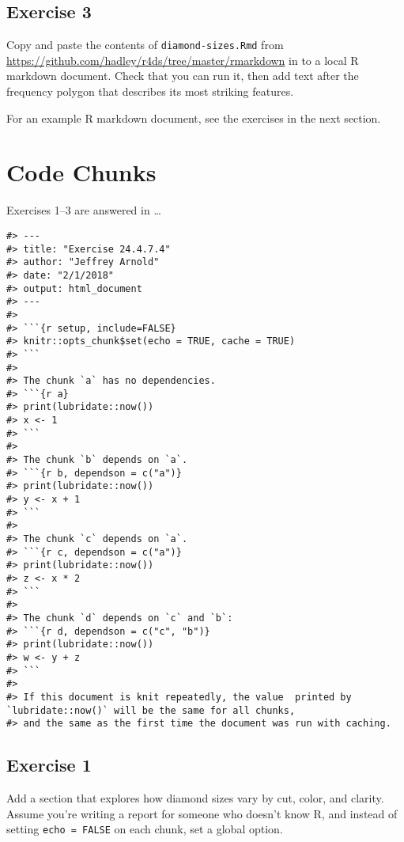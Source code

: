 \documentclass[]{book}
\theoremstyle{definition}
\theoremstyle{definition}
\theoremstyle{definition}
\theoremstyle{remark}
\begin{document}
\hypertarget{exercise-3-49}{%
\subsection{Exercise 3}\label{exercise-3-49}}

Copy and paste the contents of \texttt{diamond-sizes.Rmd} from
\url{https://github.com/hadley/r4ds/tree/master/rmarkdown} in to a local
R markdown document. Check that you can run it, then add text after the
frequency polygon that describes its most striking features.

For an example R markdown document, see the exercises in the next
section.

\hypertarget{code-chunks}{%
\section{Code Chunks}\label{code-chunks}}

Exercises 1--3 are answered in \ldots{}

\begin{verbatim}
#> ---
#> title: "Exercise 24.4.7.4"
#> author: "Jeffrey Arnold"
#> date: "2/1/2018"
#> output: html_document
#> ---
#> 
#> ```{r setup, include=FALSE}
#> knitr::opts_chunk$set(echo = TRUE, cache = TRUE)
#> ```
#> 
#> The chunk `a` has no dependencies.
#> ```{r a}
#> print(lubridate::now())
#> x <- 1
#> ```
#> 
#> The chunk `b` depends on `a`.
#> ```{r b, dependson = c("a")}
#> print(lubridate::now())
#> y <- x + 1
#> ```
#> 
#> The chunk `c` depends on `a`.
#> ```{r c, dependson = c("a")}
#> print(lubridate::now())
#> z <- x * 2
#> ```
#> 
#> The chunk `d` depends on `c` and `b`:
#> ```{r d, dependson = c("c", "b")}
#> print(lubridate::now())
#> w <- y + z
#> ```
#> 
#> If this document is knit repeatedly, the value  printed by `lubridate::now()` will be the same for all chunks,
#> and the same as the first time the document was run with caching.
\end{verbatim}

\hypertarget{exercise-1-67}{%
\subsection{Exercise 1}\label{exercise-1-67}}

Add a section that explores how diamond sizes vary by cut, color, and
clarity. Assume you're writing a report for someone who doesn't know R,
and instead of setting \texttt{echo\ =\ FALSE} on each chunk, set a
global option.
\end{document}
